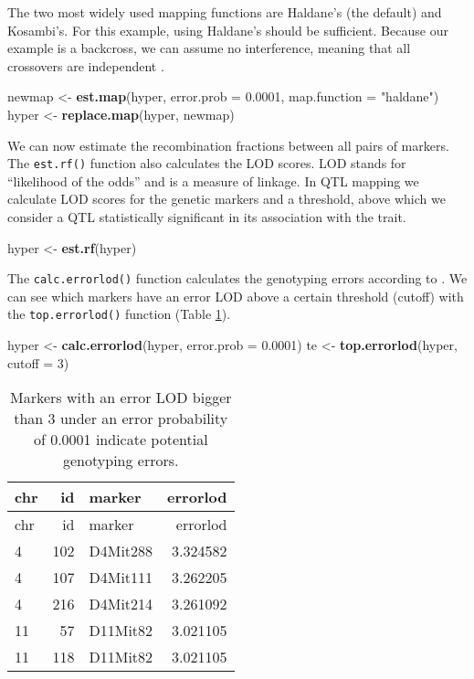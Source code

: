 \documentclass[12pt,]{krantz}
\newenvironment{Shaded}{\begin{snugshade}}{\end{snugshade}}
\newcommand{\KeywordTok}[1]{\textcolor[rgb]{0.27,0.27,0.27}{\textbf{#1}}}
\newcommand{\DataTypeTok}[1]{\textcolor[rgb]{0.27,0.27,0.27}{#1}}
\newcommand{\DecValTok}[1]{\textcolor[rgb]{0.06,0.06,0.06}{#1}}
\newcommand{\FloatTok}[1]{\textcolor[rgb]{0.06,0.06,0.06}{#1}}
\newcommand{\StringTok}[1]{\textcolor[rgb]{0.5,0.5,0.5}{#1}}
\newcommand{\NormalTok}[1]{#1}
\theoremstyle{definition}
\theoremstyle{definition}
\theoremstyle{definition}
\theoremstyle{remark}
\begin{document}
The two most widely used mapping functions are Haldane's (the default)
and Kosambi's. For this example, using Haldane's should be sufficient.
Because our example is a backcross, we can assume no interference,
meaning that all crossovers are independent \citep{lynch1998genetics}.

\begin{Shaded}
\begin{Highlighting}[]
\NormalTok{newmap <-}\StringTok{ }\KeywordTok{est.map}\NormalTok{(hyper, }\DataTypeTok{error.prob =} \FloatTok{0.0001}\NormalTok{, }
                  \DataTypeTok{map.function =} \StringTok{"haldane"}\NormalTok{)}
\NormalTok{hyper <-}\StringTok{ }\KeywordTok{replace.map}\NormalTok{(hyper, newmap)}
\end{Highlighting}
\end{Shaded}

We can now estimate the recombination fractions between all pairs of
markers. The \texttt{est.rf()} function also calculates the LOD scores.
LOD stands for ``likelihood of the odds'' and is a measure of linkage.
In QTL mapping we calculate LOD scores for the genetic markers and a
threshold, above which we consider a QTL statistically significant in
its association with the trait.

\begin{Shaded}
\begin{Highlighting}[]
\NormalTok{hyper <-}\StringTok{ }\KeywordTok{est.rf}\NormalTok{(hyper)}
\end{Highlighting}
\end{Shaded}

The \texttt{calc.errorlod()} function calculates the genotyping errors
according to \citet{Lincoln1992604}. We can see which markers have an
error LOD above a certain threshold (cutoff) with the
\texttt{top.errorlod()} function (Table \ref{tab:qtl-te}).

\begin{Shaded}
\begin{Highlighting}[]
\NormalTok{hyper <-}\StringTok{ }\KeywordTok{calc.errorlod}\NormalTok{(hyper, }\DataTypeTok{error.prob =} \FloatTok{0.0001}\NormalTok{)}
\NormalTok{te <-}\StringTok{ }\KeywordTok{top.errorlod}\NormalTok{(hyper, }\DataTypeTok{cutoff =} \DecValTok{3}\NormalTok{)}
\end{Highlighting}
\end{Shaded}

\begin{longtable}[]{@{}lrlr@{}}
\caption{\label{tab:qtl-te}Markers with an error LOD bigger than 3 under an
error probability of 0.0001 indicate potential genotyping
errors.}\tabularnewline
\toprule
chr & id & marker & errorlod\tabularnewline
\midrule
\endfirsthead
\toprule
chr & id & marker & errorlod\tabularnewline
\midrule
\endhead
4 & 102 & D4Mit288 & 3.324582\tabularnewline
4 & 107 & D4Mit111 & 3.262205\tabularnewline
4 & 216 & D4Mit214 & 3.261092\tabularnewline
11 & 57 & D11Mit82 & 3.021105\tabularnewline
11 & 118 & D11Mit82 & 3.021105\tabularnewline
\bottomrule
\end{longtable}
\end{document}
